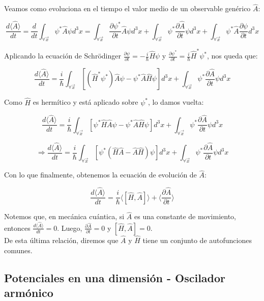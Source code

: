 \documentclass[a4paper]{article}
\begin{document}
Veamos como evoluciona en el tiempo el valor medio de un observable gen\'erico $\hat{A}$:

$$\frac{d\langle \hat{A} \rangle}{dt} = \frac{d}{dt}\int_{\forall \vec{x}} \psi^{*}\hat{A}\psi d^{3}x = \int_{\forall \vec{x}} \frac{\partial \psi^{*}}{\partial t}\hat{A}\psi d^{3}x +  \int_{\forall \vec{x}} \psi^{*}\frac{\partial \hat{A}}{\partial t}\psi d^{3}x +  \int_{\forall \vec{x}} \psi^{*}\hat{A}\frac{\partial \psi}{\partial t} d^{3}x$$

Aplicando la ecuaci\'on de Schr\"odinger $\frac{\partial \psi}{\partial t} = -\frac{i}{\hbar}\hat{H}\psi$ y $\frac{\partial \psi^{*}}{\partial t} = \frac{i}{\hbar}\hat{H}^{*}\psi^{*}$, nos queda que:

$$\frac{d\langle \hat{A} \rangle}{dt} = \frac{i}{\hbar} \int_{\forall \vec{x}}[(\hat{H}^{*}\psi^{*})\hat{A}\psi - \psi^{*}\hat{A}\hat{H}\psi]d^{3}x + \int_{\forall \vec{x}} \psi^{*}\frac{\partial \hat{A}}{\partial t}\psi d^{3}x$$

Como $\hat{H}$ es herm\'itico y est\'a aplicado sobre $\psi^{*}$, lo damos vuelta:

$$\frac{d\langle \hat{A} \rangle}{dt} = \frac{i}{\hbar} \int_{\forall \vec{x}}[\psi^{*}\hat{H}\hat{A}\psi - \psi^{*}\hat{A}\hat{H}\psi]d^{3}x + \int_{\forall \vec{x}} \psi^{*}\frac{\partial \hat{A}}{\partial t}\psi d^{3}x$$

$$ \Rightarrow \frac{d\langle \hat{A} \rangle}{dt} = \frac{i}{\hbar} \int_{\forall \vec{x}}[\psi^{*}(\hat{H}\hat{A} - \hat{A}\hat{H})\psi ]d^{3}x + \int_{\forall \vec{x}} \psi^{*}\frac{\partial \hat{A}}{\partial t}\psi d^{3}x$$

Con lo que finalmente, obtenemos la ecuaci\'on de evoluci\'on de $\hat{A}$:

\begin{equation}
\label{eq:evola}
\frac{d\langle \hat{A} \rangle}{dt} = \frac{i}{\hbar}\langle [\hat{H}, \hat{A}]\rangle + \bigg \langle \frac{\partial \hat{A}}{\partial t} \bigg \rangle
\end{equation}

Notemos que, en mec\'anica cu\'antica, si $\hat{A}$ es una constante de movimiento, entonces $\frac{d\langle \hat{A} \rangle}{dt} = 0$. Luego, $\frac{\partial \hat{A}}{\partial t} = 0$ y $[\hat{H}, \hat{A}] = 0$.\\

De esta \'ultima relaci\'on, diremos que $\hat{A}$ y $\hat{H}$ tiene un conjunto de autofunciones comunes.

\subsection{Potenciales en una dimensi\'on - Oscilador arm\'onico}
\end{document}

